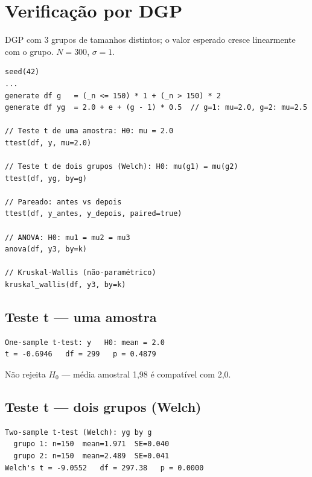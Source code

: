 \section{Verificação por DGP}

DGP com 3 grupos de tamanhos distintos; o valor esperado cresce linearmente
com o grupo. $N=300$, $\sigma = 1$.

\begin{lstlisting}[caption={Testes de hipóteses}]
seed(42)
...
generate df g   = (_n <= 150) * 1 + (_n > 150) * 2
generate df yg  = 2.0 + e + (g - 1) * 0.5  // g=1: mu=2.0, g=2: mu=2.5

// Teste t de uma amostra: H0: mu = 2.0
ttest(df, y, mu=2.0)

// Teste t de dois grupos (Welch): H0: mu(g1) = mu(g2)
ttest(df, yg, by=g)

// Pareado: antes vs depois
ttest(df, y_antes, y_depois, paired=true)

// ANOVA: H0: mu1 = mu2 = mu3
anova(df, y3, by=k)

// Kruskal-Wallis (não-paramétrico)
kruskal_wallis(df, y3, by=k)
\end{lstlisting}

\subsection*{Teste t — uma amostra}

\begin{lstlisting}[language={}, basicstyle=\ttfamily\small, frame=none,
  numbers=none, backgroundcolor=\color{codbg}]
One-sample t-test: y   H0: mean = 2.0
t = -0.6946   df = 299   p = 0.4879
\end{lstlisting}

Não rejeita $H_0$ — média amostral 1{,}98 é compatível com 2{,}0.

\subsection*{Teste t — dois grupos (Welch)}

\begin{lstlisting}[language={}, basicstyle=\ttfamily\small, frame=none,
  numbers=none, backgroundcolor=\color{codbg}]
Two-sample t-test (Welch): yg by g
  grupo 1: n=150  mean=1.971  SE=0.040
  grupo 2: n=150  mean=2.489  SE=0.041
Welch's t = -9.0552   df = 297.38   p = 0.0000
\end{lstlisting}

